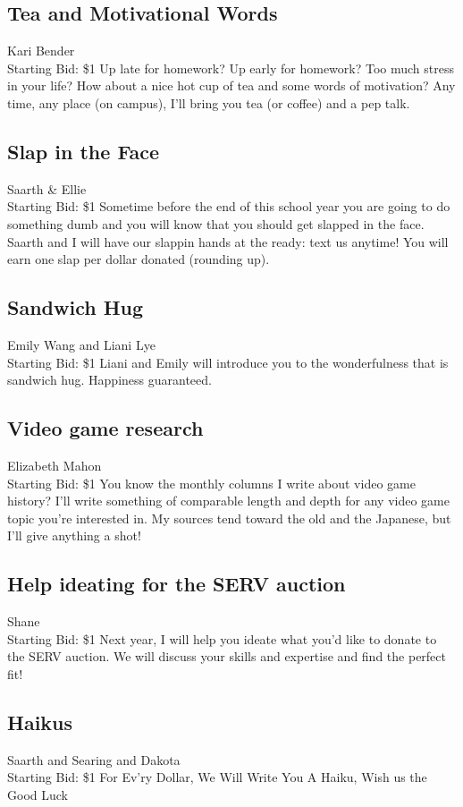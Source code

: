 \documentclass[11pt]{article}
\begin{document}
\subsection{Tea and Motivational Words}
Kari Bender
\\
Starting Bid: \$1
\newline
Up late for homework? Up early for homework? Too much stress in your life? How about a nice hot cup of tea and some words of motivation? Any time, any place (on campus), I'll bring you tea (or coffee) and a pep talk.
\subsection{Slap in the Face}
Saarth \& Ellie
\\
Starting Bid: \$1
\newline
Sometime before the end of this school year you are going to do something dumb and you will know that you should get slapped in the face. Saarth and I will have our slappin hands at the ready: text us anytime! You will earn one slap per dollar donated (rounding up).
\subsection{Sandwich Hug}
Emily Wang and Liani Lye
\\
Starting Bid: \$1
\newline
Liani and Emily will introduce you to the wonderfulness that is sandwich hug.  Happiness guaranteed.
\subsection{Video game research}
Elizabeth Mahon
\\
Starting Bid: \$1
\newline
You know the monthly columns I write about video game history? I'll write something of comparable length and depth for any video game topic you're interested in. My sources tend toward the old and the Japanese, but I'll give anything a shot!
\subsection{Help ideating for the SERV auction}
Shane
\\
Starting Bid: \$1
\newline
Next year, I will help you ideate what you'd like to donate to the SERV auction. We will discuss your skills and expertise and find the perfect fit!
\subsection{Haikus}
Saarth and Searing and Dakota
\\
Starting Bid: \$1
\newline
For Ev'ry Dollar,
We Will Write You A Haiku,
Wish us the Good Luck
\end{document}
